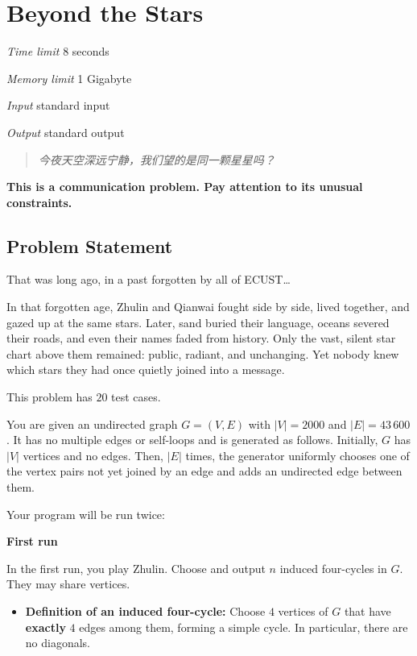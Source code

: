 \section[G. Beyond the Stars]{ Beyond the Stars}

\textit{Time limit}   8 seconds

\textit{Memory limit} 1 Gigabyte

\textit{Input} \qquad standard input

\textit{Output} \qquad standard output


\begin{quote}
	\textit{今夜天空深远宁静，我们望的是同一颗星星吗？}
\end{quote}

\textbf{This is a communication problem. Pay attention to its unusual constraints.}

\subsection{Problem Statement}

That was long ago, in a past forgotten by all of ECUST\ldots

In that forgotten age, Zhulin and Qianwai fought side by side, lived together, and gazed up at the same stars. Later, sand buried their language, oceans severed their roads, and even their names faded from history. Only the vast, silent star chart above them remained: public, radiant, and unchanging. Yet nobody knew which stars they had once quietly joined into a message.

This problem has $20$ test cases.

You are given an undirected graph $G=(V,E)$ with $|V|=2000$ and $|E|=43\,600$. It has no multiple edges or self-loops and is generated as follows. Initially, $G$ has $|V|$ vertices and no edges. Then, $|E|$ times, the generator uniformly chooses one of the vertex pairs not yet joined by an edge and adds an undirected edge between them.

Your program will be run twice:

\textbf{First run}

In the first run, you play Zhulin. Choose and output $n$ induced four-cycles in $G$. They may share vertices.

\begin{itemize}
	\item \textbf{Definition of an induced four-cycle:} Choose $4$ vertices of $G$ that have \textbf{exactly} $4$ edges among them, forming a simple cycle. In particular, there are no diagonals.
\end{itemize}


